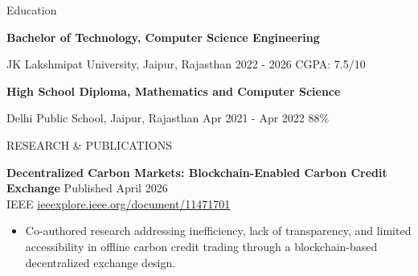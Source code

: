 \documentclass{resume} %
\begin{document}

\begin{rSection}{Education}

{\bf Bachelor of Technology, Computer Science Engineering}

{JK Lakshmipat University, Jaipur, Rajasthan} \hfill {2022 - 2026} \hfill {CGPA: 7.5/10}

{\bf High School Diploma, Mathematics and Computer Science}

{Delhi Public School, Jaipur, Rajasthan} \hfill {Apr 2021 - Apr 2022} \hfill {88\%}


\end{rSection}


\begin{rSection}{RESEARCH \& PUBLICATIONS}

\textbf{Decentralized Carbon Markets: Blockchain-Enabled Carbon Credit Exchange} \hfill Published April 2026\\
IEEE \hfill \href{https://ieeexplore.ieee.org/document/11471701}{ieeexplore.ieee.org/document/11471701}
 \begin{itemize}
    \itemsep -2pt {}
     \item Co-authored research addressing inefficiency, lack of transparency, and limited accessibility in offline carbon credit trading through a blockchain-based decentralized exchange design.
 \end{itemize}

\end{rSection}




\end{document}
